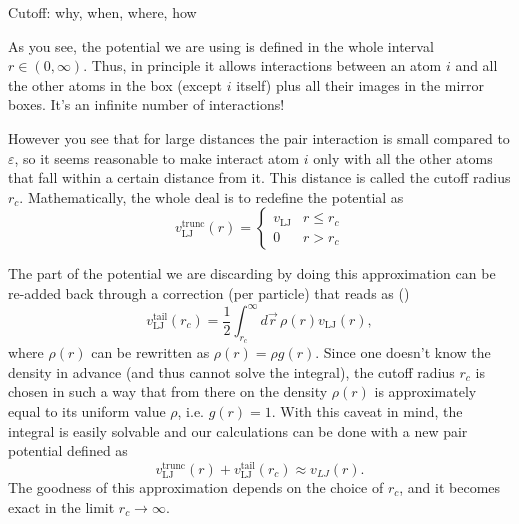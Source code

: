 \documentclass[10pt, compress, protectframetitle, handout]{beamer}
\begin{document}
\begin{frame}[allowframebreaks]{Cutoff: why, when, where, how}

	As you see, the potential we are using is defined in the whole interval $r \in (0,\infty)$. Thus, in principle it allows interactions between an atom $i$ and all the other atoms in the box (except $i$ itself) plus all their images in the mirror boxes. It's an \alert{infinite} number of interactions!
	
	However you see that for large distances the pair interaction is small compared to $\varepsilon$, so it seems reasonable to make interact atom $i$ only with all the other atoms that fall within a certain distance from it. This distance is called the \alert{cutoff radius $r_c$}. Mathematically, the whole deal is to redefine the potential as
	\begin{equation}
		v_{\mathrm{LJ}}^{\text{trunc}}(r) =
		\begin{cases}
			v_{\mathrm{LJ}} & r \leq r_c \\
			0 & r > r_c
		\end{cases}
	\end{equation}
	
	The part of the potential we are discarding by doing this approximation can be re-added back through a correction (per particle) that reads as (\cite{Frenkel2002})
	\begin{equation}
		v_{\mathrm{LJ}}^{\text{tail}}(r_c) = \frac{1}{2}\int_{r_c}^{\infty}d\vec{r}\,\rho(r)v_{\mathrm{LJ}}(r),
	\end{equation}
	where $\rho(r)$ can be rewritten as $\rho(r) = \rho g(r)$. Since one doesn't know the density in advance (and thus cannot solve the integral), the cutoff radius $r_c$ is chosen in such a way that from there on the density $\rho(r)$ is approximately equal to its uniform value $\rho$, i.e. $g(r)=1$. With this caveat in mind, the integral is easily solvable and our calculations can be done with a new pair potential defined as
	\begin{equation}
		v_{\mathrm{LJ}}^{\text{trunc}}(r) + v_{\mathrm{LJ}}^{\text{tail}}(r_c) \approx v_{LJ}(r).
	\end{equation}
	The goodness of this approximation depends on the choice of $r_c$, and it becomes exact in the limit $r_c \to \infty$.
	
\end{frame}
\end{document}
